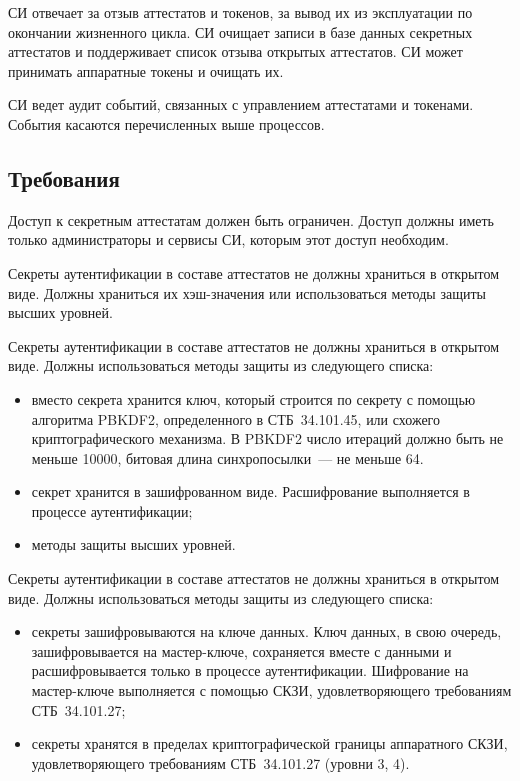 СИ отвечает за отзыв аттестатов и токенов, за вывод их из эксплуатации по 
окончании жизненного цикла. 
%
СИ очищает записи в базе данных секретных аттестатов и поддерживает список 
отзыва открытых аттестатов.
%
СИ может принимать аппаратные токены и очищать их.

СИ ведет аудит событий, связанных с управлением аттестатами и токенами. 
События касаются перечисленных выше процессов.

\subsection{Требования}\label{CM.Reqs}


Доступ к секретным аттестатам должен быть ограничен.
Доступ должны иметь только администраторы и сервисы СИ,
которым этот доступ необходим. 

Секреты аутентификации в составе аттестатов не должны храниться в открытом виде. 
Должны храниться их хэш-значения или использоваться методы защиты 
высших уровней.

Секреты аутентификации в составе аттестатов не должны храниться в открытом виде. 
Должны использоваться методы защиты из следующего списка:
\begin{itemize}
\item
вместо секрета хранится ключ, который строится по секрету с помощью 
алгоритма PBKDF2, определенного в СТБ~34.101.45, 
или схожего криптографического механизма.
%
В PBKDF2 число итераций должно быть не меньше 10000,
битовая длина синхропосылки~--- не меньше 64.

\item
секрет хранится в зашифрованном виде. Расшифрование 
выполняется в процессе аутентификации;

\item
методы защиты высших уровней.
\end{itemize}

Секреты аутентификации в составе аттестатов не должны храниться в открытом 
виде. Должны использоваться методы защиты из следующего списка:
\begin{itemize}
\item
секреты зашифровываются на ключе данных. Ключ данных, в свою очередь, 
зашифровывается на мастер-ключе, сохраняется вместе с данными
и расшифровывается только в процессе аутентификации.
%
Шифрование на мастер-ключе выполняется с помощью СКЗИ, удовлетворяющего 
требованиям СТБ~34.101.27;

\item
секреты хранятся в пределах криптографической границы аппаратного
СКЗИ, удовлетворяющего требованиям СТБ~34.101.27 (уровни 3, 4).
\end{itemize}

